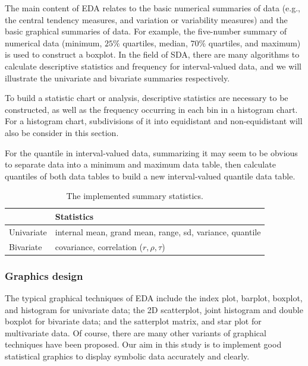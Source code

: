 \documentclass[article]{jss}
\begin{document}
The main content of EDA relates to the basic numerical summaries of
data (e.g., the central tendency measures, and variation or
variability measures) and the basic graphical summaries of data. For
example, the five-number summary of numerical data (minimum, $25\%$
quartiles, median, $70\%$ quartiles, and maximum) is used to construct
a boxplot. In the field of SDA, there are many algorithms to calculate
descriptive statistics and frequency for interval-valued data, and we
will illustrate the univariate and bivariate summaries respectively.


To build a statistic chart or analysis, descriptive statistics are
necessary to be constructed, as well as the frequency occurring in
each bin in a histogram chart. For a histogram chart, subdivisions of
it into equidistant and non-equidistant will also be consider in this
section.

For the quantile in interval-valued data, summarizing it may seem to
be obvious to separate data into a minimum and maximum data table,
then calculate quantiles of both data tables to build a new
interval-valued quantile data table.


\begin{table}[t!]
\centering
\begin{tabular}{|l|l|} \hline
            & Statistics    \\ \hline
Univariate  & internal mean, grand mean, range, sd, variance, quantile  \\ \hline
Bivariate & covariance, correlation ($r, \rho, \tau$)\\ \hline
\end{tabular}
\caption{\label{tab:stat} The implemented summary statistics.}
\end{table}



\subsubsection{Graphics design}
The typical graphical techniques of EDA include the index plot,
barplot, boxplot, and histogram for univariate data; the 2D
scatterplot, joint histogram and double boxplot for bivariate data;
and the satterplot matrix, and star plot for multivariate data. Of
course, there are many other variants of graphical techniques have
been proposed. Our aim in this study is to implement good statistical
graphics to display symbolic data accurately and clearly.
\end{document}
